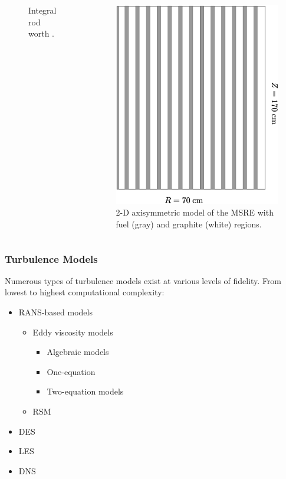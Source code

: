 \begin{frame}[noframenumbering]
\begin{columns}
\begin{figure}
      \caption{Integral rod worth \cite{prince_zero-power_1968}.}
    \end{figure}
    \hfill
    \column[t]{4cm}
    \begin{figure}
      \centering
      \includegraphics[width=.9\columnwidth]{images/msre-2d}
      \caption{2-D axisymmetric model of the MSRE with fuel (gray) and graphite (white) regions.}
    \end{figure}
  \end{columns}
\end{frame}

\begin{frame}[noframenumbering]
  \frametitle{Turbulence Models}
  Numerous types of turbulence models exist at various levels of fidelity. From lowest to highest
  computational complexity:
  \begin{itemize}
      \item RANS-based models
      \begin{itemize}
          \item Eddy viscosity models
          \begin{itemize}
              \item Algebraic models
              \item One-equation
              \item Two-equation models
          \end{itemize}
          \item \gls{RSM}
      \end{itemize}
      \item \gls{DES}
      \item \gls{LES}
      \item \gls{DNS}
  \end{itemize}
\end{frame}


